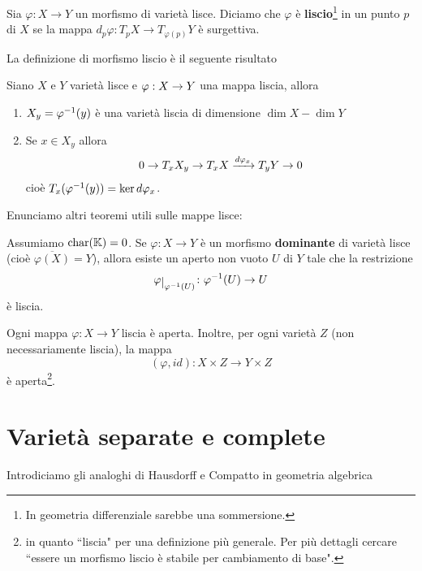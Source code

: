 \begin{definition}
    Sia $\varphi\colon X\to Y$ un morfismo di varietà lisce. Diciamo che $\varphi$ è \textbf{liscio}\footnote{In geometria differenziale sarebbe una sommersione.} in un punto $p$ di $X$ se la mappa $d_p\varphi\colon T_pX\to T_{\varphi(p)}Y$ è surgettiva.
\end{definition}

La definizione di morfismo liscio \`e il seguente risultato
\begin{theorem}\label{ThFibrePerMappeLiscie}
Siano $X$ e $Y$ variet\`a lisce e $\varphi:X\to Y$ una mappa liscia, allora
\begin{enumerate}
	\item $X_y=\varphi^{-1}(y)$ \`e una variet\`a liscia di dimensione $\dim X-\dim Y$
	\item Se $x\in X_y$ allora
	\[0\to T_x X_y\to T_x X\xrightarrow{d\varphi_x} T_y Y\to 0\]
    cio\`e $T_x (\varphi^{-1}(y))=\ker d\varphi_x$.
\end{enumerate}
\end{theorem}


Enunciamo altri teoremi utili sulle mappe lisce:
\begin{theorem}\label{ThMorfismoDominanteTraLisceHaRestrizioneLisciaSuAperto}
    Assumiamo $\operatorname{char}(\mathbb{K})=0$. Se $\varphi\colon X\to Y$ è un morfismo \textbf{dominante} di varietà lisce (cioè $\overline{\varphi(X)}=Y$), allora esiste un aperto non vuoto $U$ di $Y$ tale che la restrizione \[\varphi\res{\varphi^{-1}(U)}\colon \varphi^{-1}(U) \to U\] è liscia.
\end{theorem}

\begin{theorem}\label{ThMappaLisciaEAperta}
    Ogni mappa $\varphi\colon X \to Y$ liscia è aperta. Inoltre, per ogni varietà $Z$ (non necessariamente liscia), la mappa \[(\varphi,id)\colon X\times Z \to Y\times Z\] è aperta\footnote{in quanto ``liscia" per una definizione pi\`u generale. Per pi\`u dettagli cercare ``essere un morfismo liscio \`e stabile per cambiamento di base".}.
\end{theorem}






\section{Variet\`a separate e complete}

Introdiciamo gli analoghi di Hausdorff e Compatto in geometria algebrica

